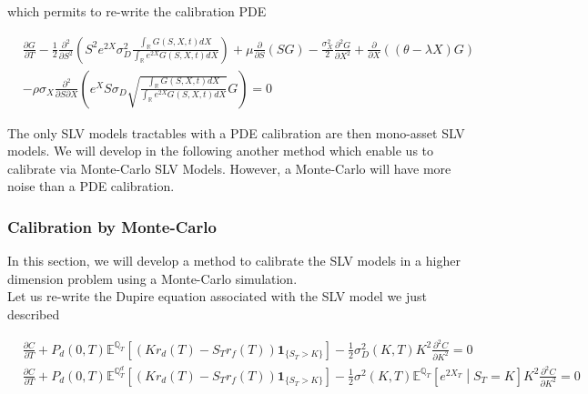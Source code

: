 \documentclass{article}
\begin{document}
\noindent which permits to re-write the calibration PDE

\begin{equation}
\begin{aligned}
\label{eq:SLVCalibrationPDE}
	&\frac{\partial G}{\partial T}
	- \frac{1}{2} \frac{\partial^2}{\partial S^2} \left(S^2 e^{2X} \sigma_D^2 \frac{\int_\mathbb{R} G(S,X,t) dX}{\int_\mathbb{R} e^{2X} G(S,X,t) dX}\right)
+ \mu \frac{\partial}{\partial S}\left( S G\right)
- \frac{\sigma_X^2}{2} \frac{\partial^2 G}{\partial X^2}
+ \frac{\partial }{\partial X} \left((\theta - \lambda X) G\right)\\
&- \rho \sigma_X \frac{\partial^2}{\partial S \partial X} \left(e^X S \sigma_D \sqrt{\frac{\int_\mathbb{R} G(S,X,t) dX}{\int_\mathbb{R} e^{2X} G(S,X,t) dX}} G\right) = 0
\end{aligned}
\end{equation}

The only SLV models tractables with a PDE calibration are then mono-asset SLV models. We will develop in the following another method which enable us to calibrate via Monte-Carlo SLV Models. However, a Monte-Carlo will have more noise than a PDE calibration.

\subsubsection{Calibration by Monte-Carlo}
In this section, we will develop a method to calibrate the SLV models in a higher dimension problem using a Monte-Carlo simulation.\\

\noindent Let us re-write the Dupire equation associated with the SLV model we just described

\begin{equation}
\begin{aligned}
	&\frac{\partial C}{\partial T} + P_d(0,T) \mathbb{E}^{\mathbb{Q}_T} \left[ \left(K r_d(T) - S_T r_f(T)\right) \textbf{1}_{\{S_T > K\}}\right] - \frac{1}{2} \sigma_D^2(K,T) K^2 \frac{\partial^2 C}{\partial K^2} = 0\\
	&\frac{\partial C}{\partial T} + P_d(0,T) \mathbb{E}^{\mathbb{Q}_T^d} \left[ \left(K r_d(T) - S_T r_f(T)\right) \textbf{1}_{\{S_T > K\}}\right] - \frac{1}{2} \sigma^2(K,T) \mathbb{E}^{\mathbb{Q}_T}\left[e^{2X_T}\middle| S_T=K\right] K^2 \frac{\partial^2 C}{\partial K^2} = 0\\
\end{aligned}
\end{equation}
\end{document}
